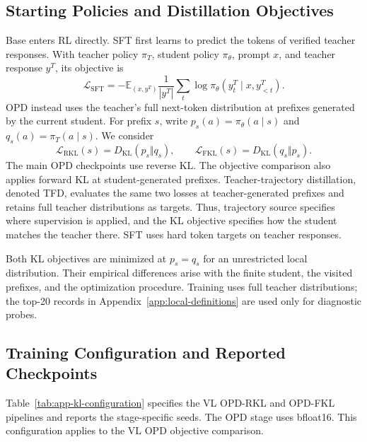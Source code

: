 \documentclass[]{jingdong}
\theoremstyle{plain}
\theoremstyle{definition}
\theoremstyle{remark}
\begin{document}
\subsection{Starting Policies and Distillation Objectives}

Base enters RL directly. SFT first learns to predict the tokens of verified teacher responses. With teacher policy $\pi_T$, student policy $\pi_\theta$, prompt $x$, and teacher response $y^T$, its objective is
\begin{equation}
\mathcal L_{\mathrm{SFT}}
=-\mathbb E_{(x,y^T)}\frac{1}{|y^T|}
\sum_t\log\pi_\theta(y_t^T\mid x,y^T_{<t}).
\end{equation}
OPD instead uses the teacher's full next-token distribution at prefixes generated by the current student. For prefix $s$, write $p_s(a)=\pi_\theta(a\mid s)$ and $q_s(a)=\pi_T(a\mid s)$. We consider
\begin{equation}
\mathcal L_{\mathrm{RKL}}(s)=D_{\mathrm{KL}}(p_s\Vert q_s),
\qquad
\mathcal L_{\mathrm{FKL}}(s)=D_{\mathrm{KL}}(q_s\Vert p_s).
\end{equation}
The main OPD checkpoints use reverse KL. The objective comparison also applies forward KL at student-generated prefixes. Teacher-trajectory distillation, denoted TFD, evaluates the same two losses at teacher-generated prefixes and retains full teacher distributions as targets. Thus, trajectory source specifies where supervision is applied, and the KL objective specifies how the student matches the teacher there. SFT uses hard token targets on teacher responses.

Both KL objectives are minimized at $p_s=q_s$ for an unrestricted local distribution. Their empirical differences arise with the finite student, the visited prefixes, and the optimization procedure. Training uses full teacher distributions; the top-20 records in Appendix~\ref{app:local-definitions} are used only for diagnostic probes.

\subsection{Training Configuration and Reported Checkpoints}

Table~\ref{tab:app-kl-configuration} specifies the VL OPD-RKL and OPD-FKL pipelines and reports the stage-specific seeds. The OPD stage uses bfloat16. This configuration applies to the VL OPD objective comparison.
\end{document}
